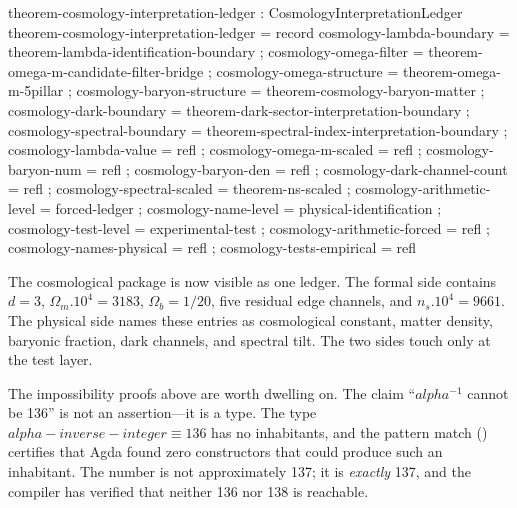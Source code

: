 \documentclass[11pt,a4paper]{book}
\def\alpha{alpha}%
\def\cdot{.}%
\def\texttt#1{#1}%
\def\text#1{#1}%
\begin{document}
\begin{code}
theorem-cosmology-interpretation-ledger : CosmologyInterpretationLedger
theorem-cosmology-interpretation-ledger = record
  { cosmology-lambda-boundary    = theorem-lambda-identification-boundary
  ; cosmology-omega-filter       = theorem-omega-m-candidate-filter-bridge
  ; cosmology-omega-structure    = theorem-omega-m-5pillar
  ; cosmology-baryon-structure   = theorem-cosmology-baryon-matter
  ; cosmology-dark-boundary      = theorem-dark-sector-interpretation-boundary
  ; cosmology-spectral-boundary  = theorem-spectral-index-interpretation-boundary
  ; cosmology-lambda-value       = refl
  ; cosmology-omega-m-scaled     = refl
  ; cosmology-baryon-num         = refl
  ; cosmology-baryon-den         = refl
  ; cosmology-dark-channel-count = refl
  ; cosmology-spectral-scaled    = theorem-ns-scaled
  ; cosmology-arithmetic-level   = forced-ledger
  ; cosmology-name-level         = physical-identification
  ; cosmology-test-level         = experimental-test
  ; cosmology-arithmetic-forced  = refl
  ; cosmology-names-physical     = refl
  ; cosmology-tests-empirical    = refl
  }
\end{code}

The cosmological package is now visible as one ledger.  The formal side
contains $d=3$, $\Omega_m\cdot 10^4=3183$, $\Omega_b=1/20$, five residual
edge channels, and $n_s\cdot 10^4=9661$.  The physical side names these
entries as cosmological constant, matter density, baryonic fraction, dark
channels, and spectral tilt.  The two sides touch only at the test layer.


The impossibility proofs above are worth dwelling on. The claim ``$\alpha^{-1}$ cannot be 136'' is not an assertion---it is a type. The type $\alpha\text{-inverse-integer} $ has no inhabitants, and the pattern match \texttt{()} certifies that Agda found zero constructors that could produce such an inhabitant. The number is not approximately 137; it is \emph{exactly} 137, and the compiler has verified that neither 136 nor 138 is reachable.
\end{document}
